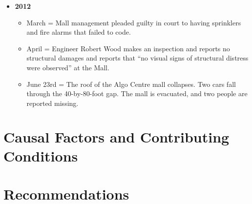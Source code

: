 \documentclass[12pt]{article}
\begin{document}
\begin{itemize}
    \item \textbf{\textbf{2012}}
    \begin{itemize}
        \item March = Mall management pleaded guilty in court to having sprinklers and fire alarms that failed to code.
        \item April = Engineer Robert Wood makes an inspection and reports no structural damages and reports that “no visual signs of structural distress were observed” at the Mall.
        \item June 23rd = The roof of the Algo Centre mall collapses. Two cars fall through the 40-by-80-foot gap. The mall is evacuated, and two people are reported missing.
    \end{itemize}
\end{itemize}



\section{Causal Factors and Contributing Conditions}



\section{Recommendations}


\end{document}
